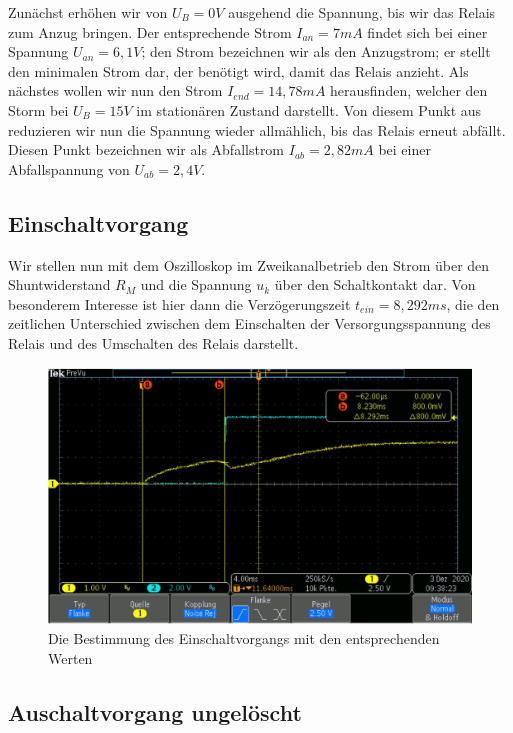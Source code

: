 \documentclass{article}
\begin{document}
Zunächst erhöhen wir von $U_B = 0V$ ausgehend die Spannung, bis wir das Relais zum Anzug bringen. Der entsprechende Strom $I_{an} = 7mA$ findet sich bei einer Spannung $U_{an} = 6,1V$; den Strom bezeichnen wir als 
den Anzugstrom; er stellt den minimalen Strom dar, der benötigt wird, damit das Relais anzieht.
Als nächstes wollen wir nun den Strom $I_{end} = 14,78mA$ herausfinden, welcher den Storm bei $U_B = 15V$ im stationären Zustand darstellt. Von diesem Punkt aus
reduzieren wir nun die Spannung wieder allmählich, bis das Relais erneut abfällt. Diesen Punkt bezeichnen wir als Abfallstrom $I_{ab} = 2,82mA$ bei einer Abfallspannung von $U_{ab} = 2,4V$.


\subsection{Einschaltvorgang}

Wir stellen nun mit dem Oszilloskop im Zweikanalbetrieb den Strom über den Shuntwiderstand $R_M$ und die Spannung $u_k$ über den Schaltkontakt dar.
Von besonderem Interesse ist hier dann die Verzögerungszeit $t_{ein} = 8,292ms$, die den zeitlichen Unterschied zwischen dem Einschalten der Versorgungsspannung des
Relais und des Umschalten des Relais darstellt.

\begin{figure}[h]
    \begin{center}
        \includegraphics[scale=0.45]{../assets/images/ET2P4/aufgabe2b.JPG}
        \caption{Die Bestimmung des Einschaltvorgangs mit den entsprechenden Werten}
    \end{center}
\end{figure}

\subsection{Auschaltvorgang ungelöscht}
\end{document}
